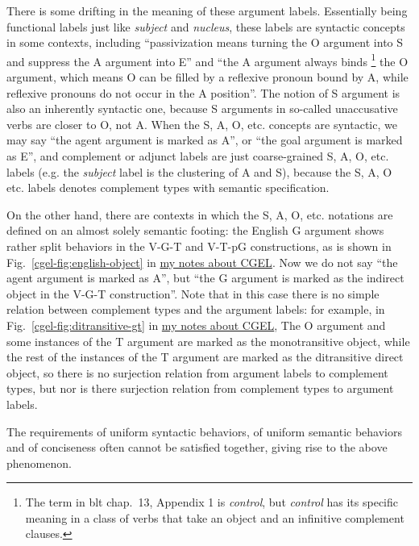 \documentclass{article}
\newcommand*{\citechap}[1]{chap.~{#1}}
\newcommand*{\citefig}[1]{Fig.~{#1}}
\newcommand*{\term}[1]{\emph{#1}}
\newcommand{\cgel}{\href{../English/cambridge.pdf}{my notes about CGEL}}
\begin{document}
There is some drifting in the meaning of these argument labels.
Essentially being functional labels just like \term{subject} and \term{nucleus},
these labels are syntactic concepts in some contexts,
including ``passivization means turning the O argument into S and suppress the A argument into E''
and ``the A argument always binds%
\footnote{
    The term in \ac{blt} \citechap{13}, Appendix 1 is \term{control},
    but \term{control} has its specific meaning in a class of verbs 
    that take an object and an infinitive complement clauses.
}
the O argument, which means O can be filled by a reflexive pronoun bound by A,
while reflexive pronouns do not occur in the A position''.
The notion of S argument is also an inherently syntactic one,
because S arguments in so-called unaccusative verbs are closer to O, not A.
When the S, A, O, etc. concepts are syntactic,
we may say ``the agent argument is marked as A'',
or ``the goal argument is marked as E'',
and complement or adjunct labels are just coarse-grained S, A, O, etc. labels
(e.g. the \term{subject} label is the clustering of A and S), 
because the S, A, O etc. labels denotes complement types with semantic specification.

On the other hand, there are contexts in which the S, A, O, etc. notations 
are defined on an almost solely semantic footing:
the English G argument shows rather split behaviors in the V-G-T and V-T-pG constructions,
as is shown in \citefig{\ref{cgel-fig:english-object}} in \cgel.
Now we do not say ``the agent argument is marked as A'',
but ``the G argument is marked as the indirect object in the V-G-T construction''.
Note that in this case there is no simple relation between complement types and the argument labels:
for example, in \citefig{\ref{cgel-fig:ditransitive-gt}} in \cgel,
The O argument and some instances of the T argument are marked as the monotransitive object,
while the rest of the instances of the T argument are marked as the ditransitive direct object,
so there is no surjection relation from argument labels to complement types,
but nor is there surjection relation from complement types to argument labels.

The requirements of uniform syntactic behaviors, 
of uniform semantic behaviors
and of conciseness
often cannot be satisfied together,
giving rise to the above phenomenon.
\end{document}
